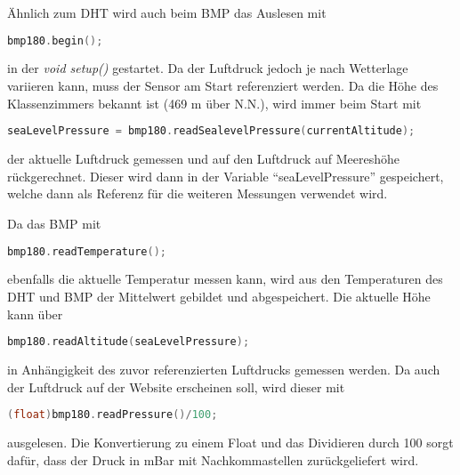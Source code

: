 	Ähnlich zum DHT wird auch beim BMP das Auslesen mit 
\begin{lstlisting}[language=C++]
	bmp180.begin();
\end{lstlisting}
	in der \textit{void setup()} gestartet.
	Da der Luftdruck jedoch je nach Wetterlage variieren kann, muss der Sensor am Start referenziert werden.
	Da die Höhe des Klassenzimmers bekannt ist (469 m über N.N.), wird immer beim Start mit 
\begin{lstlisting}[language=C++]
	seaLevelPressure = bmp180.readSealevelPressure(currentAltitude);
\end{lstlisting}
	der aktuelle Luftdruck gemessen und auf den Luftdruck auf Meereshöhe rückgerechnet. Dieser wird dann in der Variable "`seaLevelPressure"' gespeichert, welche dann als Referenz für die weiteren Messungen verwendet wird.
	
	Da das BMP mit 
\begin{lstlisting}[language=C++]
	bmp180.readTemperature();
\end{lstlisting}
	ebenfalls die aktuelle Temperatur messen kann, wird aus den Temperaturen des DHT und BMP der Mittelwert gebildet und abgespeichert.
	Die aktuelle Höhe kann über 
\begin{lstlisting}[language=C++]
	bmp180.readAltitude(seaLevelPressure);
\end{lstlisting}
	in Anhängigkeit des zuvor referenzierten Luftdrucks gemessen werden.
	Da auch der Luftdruck auf der Website erscheinen soll, wird dieser mit 
\begin{lstlisting}[language=C++]
	(float)bmp180.readPressure()/100;
\end{lstlisting}
	ausgelesen.
	Die Konvertierung zu einem Float und das Dividieren durch 100 sorgt dafür, dass der Druck in mBar mit Nachkommastellen zurückgeliefert wird.

